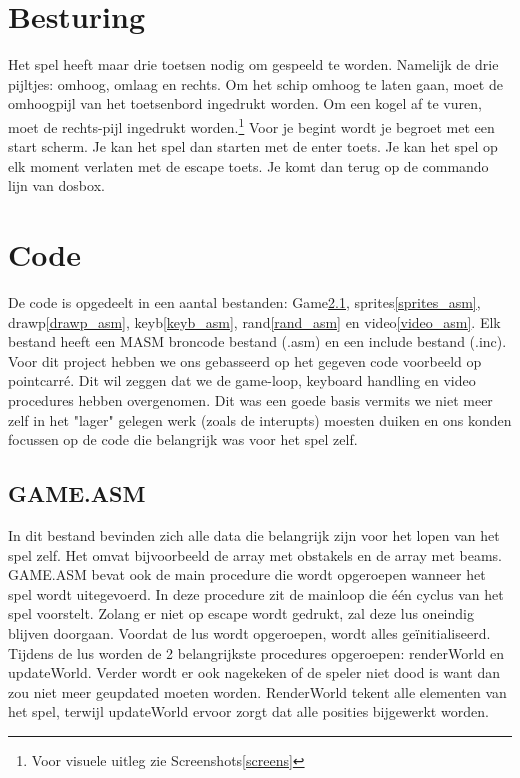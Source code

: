 \documentclass{article}
\begin{document}
\section{Besturing}

Het spel heeft maar drie toetsen nodig om gespeeld te worden. Namelijk de drie pijltjes: omhoog, omlaag en rechts.
Om het schip omhoog te laten gaan, moet de omhoogpijl van het toetsenbord ingedrukt worden.
Om een kogel af te vuren, moet de rechts-pijl ingedrukt worden.\footnote[1]{Voor visuele uitleg zie Screenshots\ref{screens}}
Voor je begint wordt je begroet met een start scherm. Je kan het spel dan starten met de enter toets. 
Je kan het spel op elk moment verlaten met de escape toets. Je komt dan terug op de commando lijn van dosbox.

\section{Code}
De code is opgedeelt in een aantal bestanden: Game\ref{game_asm}, sprites\ref{sprites_asm}, drawp\ref{drawp_asm}, keyb\ref{keyb_asm}, rand\ref{rand_asm} en video\ref{video_asm}. Elk bestand heeft een MASM broncode bestand (.asm) en een include bestand (.inc).
Voor dit project hebben we ons gebasseerd op het gegeven code voorbeeld op pointcarr\'e. Dit wil zeggen dat we de game-loop, keyboard handling en video procedures hebben overgenomen. 
Dit was een goede basis vermits we niet meer zelf in het "lager" gelegen werk (zoals de interupts) moesten duiken en ons konden focussen op de code die belangrijk was voor het spel zelf.

\subsection{GAME.ASM}\label{game_asm}
In dit bestand bevinden zich alle data die belangrijk zijn voor het lopen van het spel zelf. Het omvat bijvoorbeeld de array met obstakels en de array met beams.
GAME.ASM bevat ook de main procedure die wordt opgeroepen wanneer het spel wordt uitegevoerd. In deze procedure zit de mainloop die \'e\'en cyclus van het spel voorstelt.
Zolang er niet op escape wordt gedrukt, zal deze lus oneindig blijven doorgaan. Voordat de lus wordt opgeroepen, wordt alles ge\"initialiseerd. Tijdens de lus worden de 2 belangrijkste procedures opgeroepen: renderWorld en updateWorld. 
Verder wordt er ook nagekeken of de speler niet dood is want dan zou  niet meer geupdated moeten worden.
RenderWorld tekent alle elementen van het spel, terwijl updateWorld ervoor zorgt dat alle posities bijgewerkt worden.  %
\end{document}
